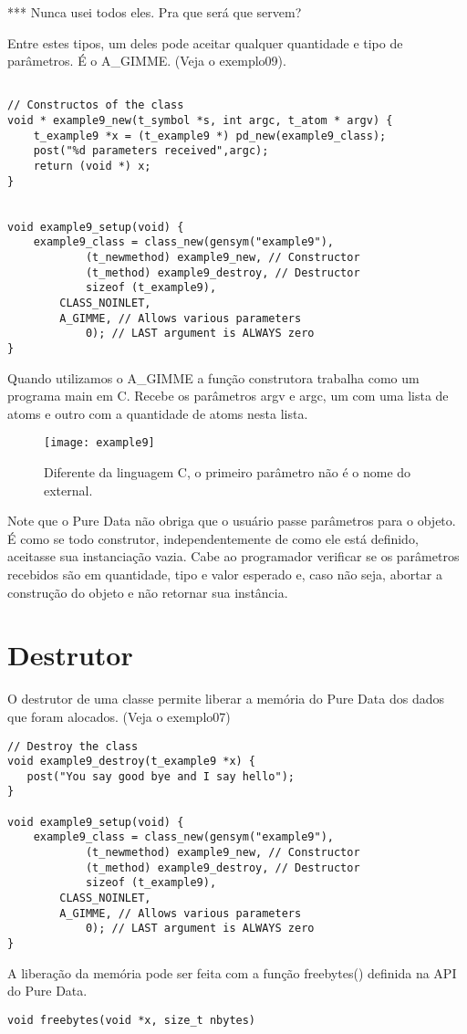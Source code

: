 *** Nunca usei todos eles. Pra que será que servem?

Entre estes tipos, um deles pode aceitar qualquer quantidade e tipo de
parâmetros. É o A\_GIMME. (Veja o exemplo09). 

\begin{lstlisting}

// Constructos of the class
void * example9_new(t_symbol *s, int argc, t_atom * argv) {
    t_example9 *x = (t_example9 *) pd_new(example9_class);
    post("%d parameters received",argc);
    return (void *) x;
}


void example9_setup(void) {
    example9_class = class_new(gensym("example9"),
            (t_newmethod) example9_new, // Constructor
            (t_method) example9_destroy, // Destructor
            sizeof (t_example9),
	    CLASS_NOINLET,
	    A_GIMME, // Allows various parameters
            0); // LAST argument is ALWAYS zero
}
\end{lstlisting}

Quando utilizamos o A\_GIMME a função construtora trabalha como um programa
main em C. Recebe os parâmetros argv e argc, um com uma lista de atoms e outro
com a quantidade de atoms nesta lista.

\begin{figure}[h!]
	\centering
	\texttt{[image: example9]}
	\caption{Diferente da linguagem C, o primeiro parâmetro não é o nome do external.}
\end{figure}

Note que o Pure Data não obriga que o usuário passe parâmetros para o objeto. É
como se todo construtor, independentemente de como ele está definido, aceitasse
sua instanciação vazia. Cabe ao programador verificar se os parâmetros
recebidos são em quantidade, tipo e valor esperado e, caso não seja, abortar a
construção do objeto e não retornar sua instância.

\section{Destrutor}
O destrutor de uma classe permite liberar a memória do Pure Data dos dados que foram alocados. (Veja o exemplo07)
\begin{lstlisting}
// Destroy the class
void example9_destroy(t_example9 *x) {
   post("You say good bye and I say hello");
}

void example9_setup(void) {
    example9_class = class_new(gensym("example9"),
            (t_newmethod) example9_new, // Constructor
            (t_method) example9_destroy, // Destructor
            sizeof (t_example9),
	    CLASS_NOINLET,
	    A_GIMME, // Allows various parameters
            0); // LAST argument is ALWAYS zero
}

\end{lstlisting}

A liberação da memória pode ser feita com a função freebytes() definida na API
do Pure Data.

\begin{lstlisting}
void freebytes(void *x, size_t nbytes)
\end{lstlisting}

